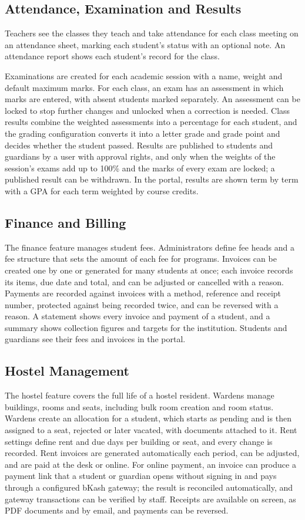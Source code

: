 \subsection{Attendance, Examination and Results}
Teachers see the classes they teach and take attendance for each class meeting on an attendance sheet, marking each student's status with an optional note. An attendance report shows each student's record for the class.

Examinations are created for each academic session with a name, weight and default maximum marks. For each class, an exam has an assessment in which marks are entered, with absent students marked separately. An assessment can be locked to stop further changes and unlocked when a correction is needed. Class results combine the weighted assessments into a percentage for each student, and the grading configuration converts it into a letter grade and grade point and decides whether the student passed. Results are published to students and guardians by a user with approval rights, and only when the weights of the session's exams add up to 100\% and the marks of every exam are locked; a published result can be withdrawn. In the portal, results are shown term by term with a GPA for each term weighted by course credits.

\subsection{Finance and Billing}
The finance feature manages student fees. Administrators define fee heads and a fee structure that sets the amount of each fee for programs. Invoices can be created one by one or generated for many students at once; each invoice records its items, due date and total, and can be adjusted or cancelled with a reason. Payments are recorded against invoices with a method, reference and receipt number, protected against being recorded twice, and can be reversed with a reason. A statement shows every invoice and payment of a student, and a summary shows collection figures and targets for the institution. Students and guardians see their fees and invoices in the portal.

\subsection{Hostel Management}
The hostel feature covers the full life of a hostel resident. Wardens manage buildings, rooms and seats, including bulk room creation and room status. Wardens create an allocation for a student, which starts as pending and is then assigned to a seat, rejected or later vacated, with documents attached to it. Rent settings define rent and due days per building or seat, and every change is recorded. Rent invoices are generated automatically each period, can be adjusted, and are paid at the desk or online. For online payment, an invoice can produce a payment link that a student or guardian opens without signing in and pays through a configured bKash gateway; the result is reconciled automatically, and gateway transactions can be verified by staff. Receipts are available on screen, as PDF documents and by email, and payments can be reversed.

